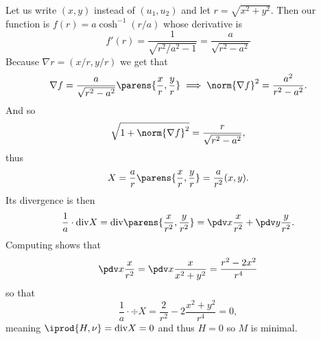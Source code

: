     \item Let us write $(x,y)$ instead of $(u_1,u_2)$ and let $r=\sqrt{x^2+y^2}$.
    Then our function is $f(r)=a\cosh^{-1}(r/a)$ whose derivative is
    $$ f'(r) = \frac1{\sqrt{r^2/a^2-1}} = \frac a{\sqrt{r^2-a^2}} $$
    Because $\nabla r=(x/r,y/r)$ we get that
    $$ \nabla f = \frac a{\sqrt{r^2-a^2}}\parens{\frac xr,\frac yr} \implies \norm{\nabla f}^2 = \frac{a^2}{r^2-a^2} . $$
    And so
    $$ \sqrt{1 + \norm{\nabla f}^2} = \frac{r}{\sqrt{r^2-a^2}} , $$
    thus
    $$ X = \frac ar\parens{\frac xr,\frac yr} = \frac a{r^2}(x,y) . $$
    Its divergence is then
    $$ \frac1a\cdot\div X = \div\parens{\frac x{r^2},\frac y{r^2}} = \pdv x\frac x{r^2} + \pdv y\frac y{r^2} . $$
    Computing shows that
    $$ \pdv x\frac x{r^2} = \pdv x\frac x{x^2+y^2} = \frac{r^2-2x^2}{r^4} $$
    so that
    $$ \frac1a\cdot\div X = \frac2{r^2} - 2\frac{x^2+y^2}{r^4} = 0  , $$
    meaning $\iprod{H,\nu}=\div X=0$ and thus $H=0$ so $M$ is minimal.
\eenum



